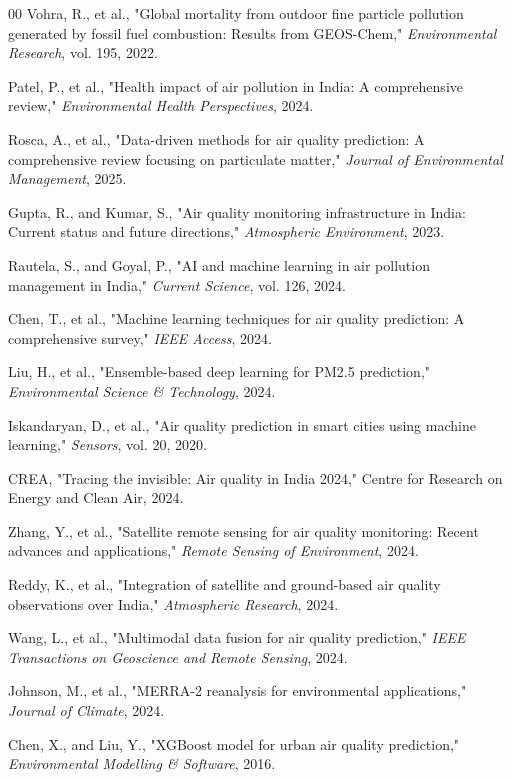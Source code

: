 \documentclass[10pt,twocolumn]{article}
\begin{document}
\begin{thebibliography}{00}
 Vohra, R., et al., "Global mortality from outdoor fine particle pollution generated by fossil fuel combustion: Results from GEOS-Chem," \textit{Environmental Research}, vol. 195, 2022.

 Patel, P., et al., "Health impact of air pollution in India: A comprehensive review," \textit{Environmental Health Perspectives}, 2024.

 Rosca, A., et al., "Data-driven methods for air quality prediction: A comprehensive review focusing on particulate matter," \textit{Journal of Environmental Management}, 2025.

 Gupta, R., and Kumar, S., "Air quality monitoring infrastructure in India: Current status and future directions," \textit{Atmospheric Environment}, 2023.

 Rautela, S., and Goyal, P., "AI and machine learning in air pollution management in India," \textit{Current Science}, vol. 126, 2024.

 Chen, T., et al., "Machine learning techniques for air quality prediction: A comprehensive survey," \textit{IEEE Access}, 2024.

 Liu, H., et al., "Ensemble-based deep learning for PM2.5 prediction," \textit{Environmental Science \& Technology}, 2024.

 Iskandaryan, D., et al., "Air quality prediction in smart cities using machine learning," \textit{Sensors}, vol. 20, 2020.

 CREA, "Tracing the invisible: Air quality in India 2024," Centre for Research on Energy and Clean Air, 2024.

 Zhang, Y., et al., "Satellite remote sensing for air quality monitoring: Recent advances and applications," \textit{Remote Sensing of Environment}, 2024.

 Reddy, K., et al., "Integration of satellite and ground-based air quality observations over India," \textit{Atmospheric Research}, 2024.

 Wang, L., et al., "Multimodal data fusion for air quality prediction," \textit{IEEE Transactions on Geoscience and Remote Sensing}, 2024.

 Johnson, M., et al., "MERRA-2 reanalysis for environmental applications," \textit{Journal of Climate}, 2024.

 Chen, X., and Liu, Y., "XGBoost model for urban air quality prediction," \textit{Environmental Modelling \& Software}, 2016.
\end{thebibliography}
\end{document}

